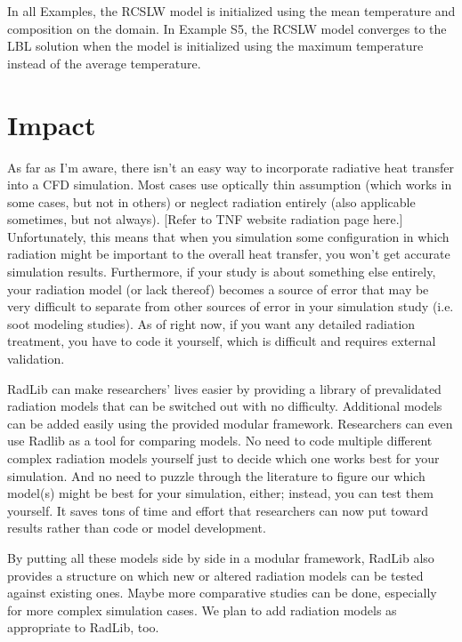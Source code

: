 \documentclass[preprint,12pt, a4paper]{elsarticle}
\begin{document}
In all Examples, the RCSLW model is initialized using the mean temperature and composition on the domain. In Example S5, the RCSLW model converges to the LBL solution when the model is initialized using the maximum temperature instead of the average temperature.



\section{Impact}
\label{s:impact}

As far as I'm aware, there isn't an easy way to incorporate radiative heat transfer into a CFD simulation. Most cases use optically thin assumption (which works in some cases, but not in others) or neglect radiation entirely (also applicable sometimes, but not always). [Refer to TNF website radiation page here.] Unfortunately, this means that when you simulation some configuration in which radiation might be important to the overall heat transfer, you won't get accurate simulation results. Furthermore, if your study is about something else entirely, your radiation model (or lack thereof) becomes a source of error that may be very difficult to separate from other sources of error in your simulation study (i.e. soot modeling studies). As of right now, if you want any detailed radiation treatment, you have to code it yourself, which is difficult and requires external validation. 

RadLib can make researchers' lives easier by providing a library of prevalidated radiation models that can be switched out with no difficulty. Additional models can be added easily using the provided modular framework. Researchers can even use Radlib as a tool for comparing models. No need to code multiple different complex radiation models yourself just to decide which one works best for your simulation. And no need to puzzle through the literature to figure our which model(s) might be best for your simulation, either; instead, you can test them yourself. It saves tons of time and effort that researchers can now put toward results rather than code or model development. 

By putting all these models side by side in a modular framework, RadLib also provides a structure on which new or altered radiation models can be tested against existing ones. Maybe more comparative studies can be done, especially for more complex simulation cases. We plan to add radiation models as appropriate to RadLib, too. 
\end{document}
